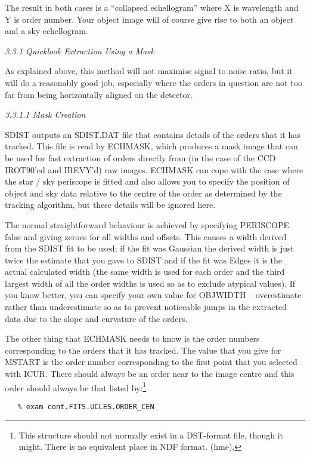 The result in both cases is a ``collapsed echellogram'' where X is wavelength
and Y is order number. Your object image will of course give rise to both an
object and a sky echellogram.


\goodbreak
\vspace{12pt}
{\it 3.3.1 Quicklook Extraction Using a Mask}

As explained above, this method will not maximise signal to noise ratio, but it
will do a reasonably good job, especially where the orders in question are not
too far from being horizontally aligned on the detector.


\goodbreak
\vspace{12pt}
{\it 3.3.1.1 Mask Creation}

SDIST outputs an SDIST.DAT file that contains details of the orders that it has
tracked. This file is read by ECHMASK, which produces a mask image that can be
used for fast extraction of orders directly from (in the case of the CCD
IROT90'ed and IREVY'd) raw images.  ECHMASK can cope with the case where the
star / sky periscope is fitted and also allows you to specify the position of
object and sky data relative to the centre of the order as determined by the
tracking algorithm, but these details will be ignored here.

The normal straightforward behaviour is achieved by specifying PERISCOPE false
and giving zeroes for all widths and offsets. This causes a width derived from
the SDIST fit to be used; if the fit was Gaussian the derived width is just
twice the estimate that you gave to SDIST and if the fit was Edges it is the
actual calculated width (the same width is used for each order and the third
largest width of all the order widths is used so as to exclude atypical
values). If you know better, you can specify your own value for OBJWIDTH
-- overestimate rather than underestimate so as to prevent noticeable jumps
in the extracted data due to the slope and curvature of the orders.

The other thing that ECHMASK needs to know is the order numbers corresponding
to the orders that it has tracked. The value that you give for MSTART is
the order number corresponding to the first point that you selected with
ICUR. There should always be an order near to the image centre and this
order should always be that listed by:\footnote{
   This structure should not normally exist in a DST-format file, though
   it might.  There is no equivalent place in NDF format. (hme).}

\begin{verbatim}
   % exam cont.FITS.UCLES.ORDER_CEN
\end{verbatim}

